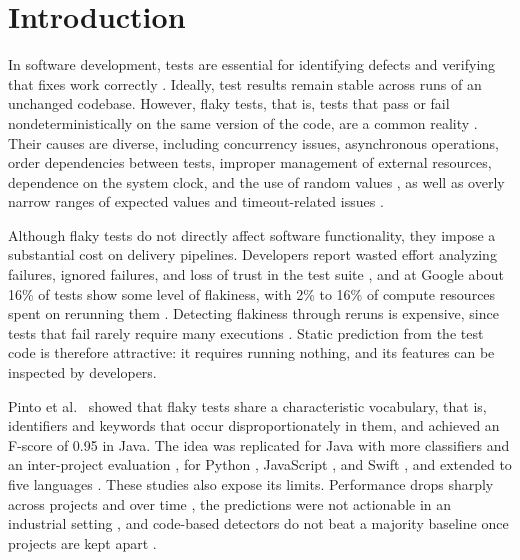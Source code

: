 \section{Introduction}
\label{sec:intro}
In software development, tests are essential for identifying defects and verifying that fixes work correctly \cite{kapfhammer2004software}. Ideally, test results remain stable across runs of an unchanged codebase. However, flaky tests, that is, tests that pass or fail nondeterministically on the same version of the code, are a common reality \cite{parry2021survey, pinto2020vocabulary}. Their causes are diverse, including concurrency issues, asynchronous operations, order dependencies between tests, improper management of external resources, dependence on the system clock, and the use of random values \cite{luo2014empirical}, as well as overly narrow ranges of expected values and timeout-related issues \cite{eck2019understanding}.

Although flaky tests do not directly affect software functionality, they impose a substantial cost on delivery pipelines. Developers report wasted effort analyzing failures, ignored failures, and loss of trust in the test suite \cite{eck2019understanding, gruber2022survey}, and at Google about 16\% of tests show some level of flakiness, with 2\% to 16\% of compute resources spent on rerunning them \cite{micco2017state}. Detecting flakiness through reruns is expensive, since tests that fail rarely require many executions \cite{lam2020study}. Static prediction from the test code is therefore attractive: it requires running nothing, and its features can be inspected by developers.

Pinto et al.~\cite{pinto2020vocabulary} showed that flaky tests share a characteristic vocabulary, that is, identifiers and keywords that occur disproportionately in them, and achieved an F-score of 0.95 in Java. The idea was replicated for Java with more classifiers and an inter-project evaluation \cite{camara2021revisiting}, for Python \cite{haben2021replication}, JavaScript \cite{soratto2023vocabulary}, and Swift \cite{medeiros2026vocabulary}, and extended to five languages \cite{ahmad2025understanding}. These studies also expose its limits. Performance drops sharply across projects \cite{camara2021revisiting, soratto2023vocabulary} and over time \cite{haben2021replication}, the predictions were not actionable in an industrial setting \cite{berndt2023vocabulary}, and code-based detectors do not beat a majority baseline once projects are kept apart \cite{gultekin2026limits}.

